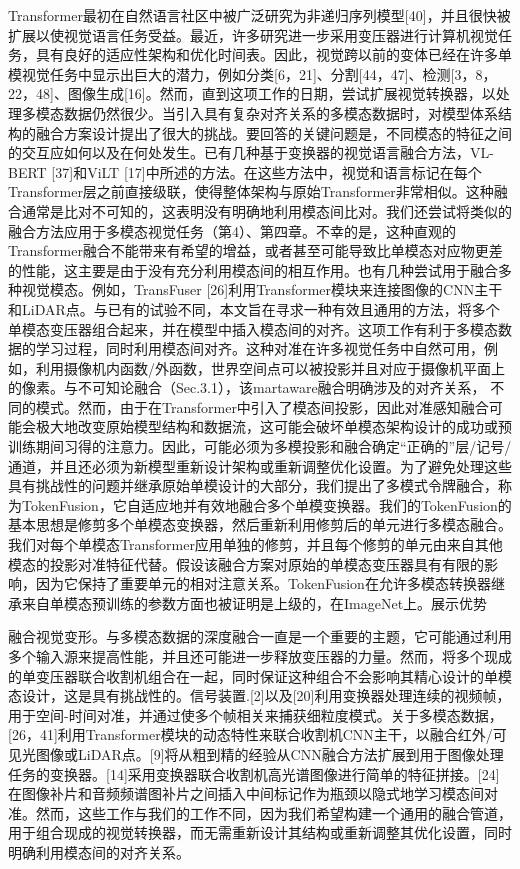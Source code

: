 Transformer最初在自然语言社区中被广泛研究为非递归序列模型[40]，并且很快被扩展以使视觉语言任务受益。最近，许多研究进一步采用变压器进行计算机视觉任务，具有良好的适应性架构和优化时间表。因此，视觉跨以前的变体已经在许多单模视觉任务中显示出巨大的潜力，例如分类[6，21]、分割[44，47]、检测[3，8，22，48]、图像生成[16]。然而，直到这项工作的日期，尝试扩展视觉转换器，以处理多模态数据仍然很少。当引入具有复杂对齐关系的多模态数据时，对模型体系结构的融合方案设计提出了很大的挑战。要回答的关键问题是，不同模态的特征之间的交互应如何以及在何处发生。已有几种基于变换器的视觉语言融合方法，VL-BERT [37]和ViLT [17]中所述的方法。在这些方法中，视觉和语言标记在每个Transformer层之前直接级联，使得整体架构与原始Transformer非常相似。这种融合通常是比对不可知的，这表明没有明确地利用模态间比对。我们还尝试将类似的融合方法应用于多模态视觉任务（第4）、第四章。不幸的是，这种直观的Transformer融合不能带来有希望的增益，或者甚至可能导致比单模态对应物更差的性能，这主要是由于没有充分利用模态间的相互作用。也有几种尝试用于融合多种视觉模态。例如，TransFuser [26]利用Transformer模块来连接图像的CNN主干和LiDAR点。与已有的试验不同，本文旨在寻求一种有效且通用的方法，将多个单模态变压器组合起来，并在模型中插入模态间的对齐。这项工作有利于多模态数据的学习过程，同时利用模态间对齐。这种对准在许多视觉任务中自然可用，例如，利用摄像机内函数/外函数，世界空间点可以被投影并且对应于摄像机平面上的像素。与不可知论融合（Sec.3.1），该martaware融合明确涉及的对齐关系，
不同的模式。然而，由于在Transformer中引入了模态间投影，因此对准感知融合可能会极大地改变原始模型结构和数据流，这可能会破坏单模态架构设计的成功或预训练期间习得的注意力。因此，可能必须为多模投影和融合确定“正确的”层/记号/通道，并且还必须为新模型重新设计架构或重新调整优化设置。为了避免处理这些具有挑战性的问题并继承原始单模设计的大部分，我们提出了多模式令牌融合，称为TokenFusion，它自适应地并有效地融合多个单模变换器。我们的TokenFusion的基本思想是修剪多个单模态变换器，然后重新利用修剪后的单元进行多模态融合。我们对每个单模态Transformer应用单独的修剪，并且每个修剪的单元由来自其他模态的投影对准特征代替。假设该融合方案对原始的单模态变压器具有有限的影响，因为它保持了重要单元的相对注意关系。TokenFusion在允许多模态转换器继承来自单模态预训练的参数方面也被证明是上级的，在ImageNet上。展示优势


融合视觉变形。与多模态数据的深度融合一直是一个重要的主题，它可能通过利用多个输入源来提高性能，并且还可能进一步释放变压器的力量。然而，将多个现成的单变压器联合收割机组合在一起，同时保证这种组合不会影响其精心设计的单模态设计，这是具有挑战性的。信号装置.[2]以及[20]利用变换器处理连续的视频帧，用于空间-时间对准，并通过使多个帧相关来捕获细粒度模式。关于多模态数据，[26，41]利用Transformer模块的动态特性来联合收割机CNN主干，以融合红外/可见光图像或LiDAR点。[9]将从粗到精的经验从CNN融合方法扩展到用于图像处理任务的变换器。[14]采用变换器联合收割机高光谱图像进行简单的特征拼接。[24]在图像补片和音频频谱图补片之间插入中间标记作为瓶颈以隐式地学习模态间对准。然而，这些工作与我们的工作不同，因为我们希望构建一个通用的融合管道，用于组合现成的视觉转换器，而无需重新设计其结构或重新调整其优化设置，同时明确利用模态间的对齐关系。


